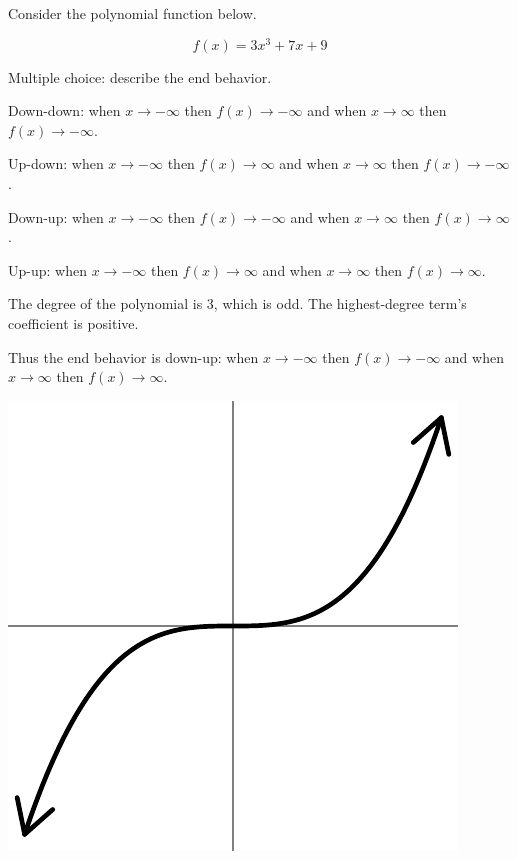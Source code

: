 
\begin{question}
Consider the polynomial function below.

\[f(x)=3 x^{3} + 7 x + 9\]

Multiple choice: describe the end behavior.
\begin{answerlist}
  \item Down-down: when \(x\to -\infty\) then \(f(x)\to -\infty\) and when
\(x\to \infty\) then \(f(x)\to -\infty\).
  \item Up-down: when \(x\to -\infty\) then \(f(x)\to \infty\) and when
\(x\to \infty\) then \(f(x)\to -\infty\).
  \item Down-up: when \(x\to -\infty\) then \(f(x)\to -\infty\) and when
\(x\to \infty\) then \(f(x)\to \infty\).
  \item Up-up: when \(x\to -\infty\) then \(f(x)\to \infty\) and when
\(x\to \infty\) then \(f(x)\to \infty\).
\end{answerlist}
\end{question}

\begin{solution}
The degree of the polynomial is 3, which is odd. The highest-degree
term's coefficient is positive.

Thus the end behavior is down-up: when \(x\to -\infty\) then
\(f(x)\to -\infty\) and when \(x\to \infty\) then \(f(x)\to \infty\).

\includegraphics{unnamed-chunk-2-1.pdf} ~
\end{solution}

